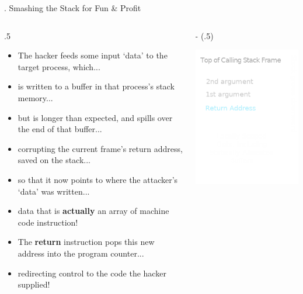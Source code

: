 \documentclass[9pt]{beamer}
\newcommand{\TwoCol}[3][.5] {
  \begin{columns}
    \begin{column}{#1\textwidth}
      #2
    \end{column}
    \begin{column}{\textwidth - (#1\textwidth)}
      #3
    \end{column}
  \end{columns}
}
\begin{document}
\begin{frame}{\theframenumber. Smashing the Stack for Fun \& Profit}
  \TwoCol {
      \small
      \begin{itemize}
      \item<+-> The hacker feeds some input `data' to the target process, which...
      \item<+-> is written to a buffer in that process's stack memory...
      \item<+-> but is longer than expected, and spills over the end of that buffer...
      \item<+-> corrupting the current frame's return address, saved on the stack...
      \item<+-> so that it now points to where the attacker's `data' was written...
      \item<+-> data that is \textbf{actually} an array of machine code instruction!
      \item<+-> The \textbf{return} instruction pops this new address into the program counter...
      \item<+-> redirecting control to the code the hacker supplied!
      \end{itemize}
  } {
      \includegraphics[width=\textwidth]{../images/stack_frame.png}
  
  }
\end{frame}
\end{document}

